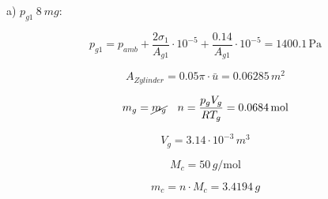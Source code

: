 a) $p_{g1} \ 8 \ mg:$

\[
p_{g1} = p_{amb} + \frac{2 \sigma_1}{A_{g1}} \cdot 10^{-5} + \frac{0.14}{A_{g1}} \cdot 10^{-5} = 1400.1 \, \text{Pa}
\]

\[
A_{Zylinder} = 0.05 \pi \cdot \bar{u} = 0.06285 \, m^2
\]

\[
m_g = \cancel{m_g} \quad n = \frac{p_g V_g}{R T_g} = 0.0684 \, \text{mol}
\]

\[
V_g = 3.14 \cdot 10^{-3} \, m^3
\]

\[
M_c = 50 \, g/\text{mol}
\]

\[
m_c = n \cdot M_c = 3.4194 \, g
\]